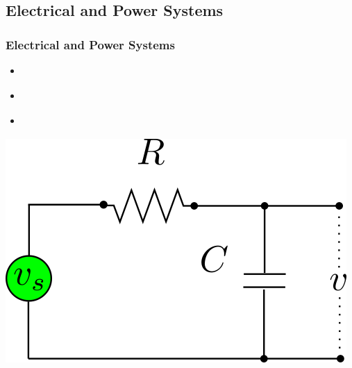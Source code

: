 \documentclass[fleqn]{beamer} %
\newcommand{\sectionIIIsubsectionIVtitle}{Electrical and Power Systems}
\begin{document}
		\subsection{\sectionIIIsubsectionIVtitle}\label{sectionIIIsubsectionIV}	

			\begin{frame}
				\frametitle{\sectionIIIsubsectionIVtitle}
				\begin{multicols}{2}
					\begin{itemize}
						\item \underline{\hspace{40mm}} \vspcc
						\item \underline{\hspace{40mm}} \vspcc
						\item \underline{\hspace{40mm}} \vspcc
					\end{itemize}

					\includegraphics[scale=.25]{images/rc_circuit.png}
				\end{multicols}
				
			\end{frame}
\end{document}
